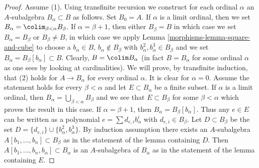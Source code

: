 \begin{proof}

Assume (1). Using transfinite recursion we construct for each ordinal $\alpha$
an $A$-subalgebra $B_\alpha \subset B$ as follows. Set $B_0 = A$. If $\alpha$
is a limit ordinal, then we set $B_\alpha = \colim_{\beta < \alpha} B_\beta$.
If $\alpha = \beta + 1$, then either
$B_\beta = B$ in which case we set $B_\alpha = B_\beta$ or
$B_\beta \not = B$, in which case we apply Lemma \ref{morphisms-lemma-square-and-cube}
to choose a $b_\alpha \in B$, $b_\alpha \not \in B_\beta$ with
$b_\alpha^2, b_\alpha^3 \in B_\beta$
and we set $B_\alpha = B_\beta[b_\alpha] \subset B$.
Clearly, $B = \colim B_\alpha$ (in fact $B = B_\alpha$ for some
ordinal $\alpha$ as one sees by looking at cardinalities).
We will prove, by transfinite induction, that (2) holds for
$A \to B_\alpha$ for every ordinal $\alpha$. It is clear for
$\alpha = 0$. Assume the statement holds for every $\beta < \alpha$
and let $E \subset B_\alpha$ be a finite subset.
If $\alpha$ is a limit ordinal, then
$B_\alpha = \bigcup_{\beta < \alpha} B_\beta$ and we see
that $E \subset B_\beta$ for some $\beta < \alpha$ which
proves the result in this case. If $\alpha = \beta + 1$,
then $B_\alpha = B_\beta[b_\alpha]$. Thus any $e \in E$
can be written as a polynomial $e = \sum d_{e, i}b_\alpha^i$
with $d_{e, i} \in B_\beta$. Let $D \subset B_\beta$
be the set $D = \{d_{e, i}\} \cup \{b_\alpha^2, b_\alpha^3\}$.
By induction assumption
there exists an $A$-subalgebra $A[b_1, \ldots, b_n] \subset B_\beta$
as in the statement of the lemma containing $D$.
Then $A[b_1, \ldots, b_n, b_\alpha] \subset B_\alpha$
is an $A$-subalgebra of $B_\alpha$ as in the statement
of the lemma containing $E$.


\end{proof}
